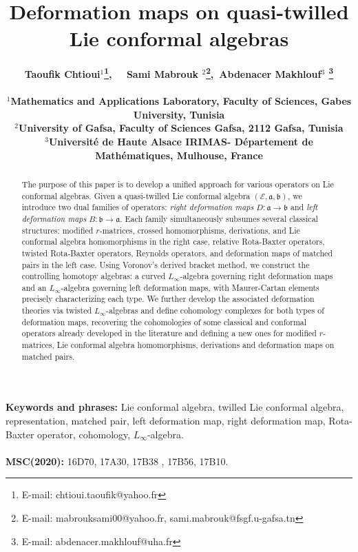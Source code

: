 \documentclass[a4paper,11pt]{article}
\def\Ep{\mathcal{E}}
\def\Vs{\mathfrak{a}}
\def\Ws{\mathfrak{b}}
\numberwithin{equation}{section}
\begin{document}

\title{\sf Deformation maps on quasi-twilled Lie conformal algebras}
\date{}
\author{ \bf 
  Taoufik Chtioui$^{1}$\footnote{E-mail: chtioui.taoufik@yahoo.fr  },
  \ \ Sami Mabrouk $^{2}$\footnote{E-mail: mabrouksami00@yahoo.fr, sami.mabrouk@fsgf.u-gafsa.tn  },\   Abdenacer Makhlouf$^{3}$
    \footnote {  E-mail:  abdenacer.makhlouf@uha.fr }
\\ \\
$^{1}${\small Mathematics and Applications Laboratory, Faculty of Sciences, Gabes University, Tunisia } \\
$^{2}${\small  University of Gafsa, Faculty of Sciences Gafsa, 2112 Gafsa, Tunisia }\\
$^{3}${\small Université de Haute Alsace IRIMAS- Département de Mathématiques, Mulhouse, 
France} 
}
\maketitle

\begin{abstract} The purpose of  this paper is to 
develop a unified approach  for various operators on 
Lie conformal algebras. Given a quasi-twilled Lie conformal algebra $(\Ep,\Vs,\Ws)$, we
introduce two dual families of operators: \emph{right deformation maps}
$D:\Vs\to\Ws$ and \emph{left deformation maps} $B:\Ws\to\Vs$. Each
family simultaneously subsumes several classical structures:
 modified $r$-matrices,  crossed homomorphisms,
 derivations, and  Lie conformal algebra homomorphisms in the
right case,  relative Rota-Baxter operators,  twisted
Rota-Baxter operators,  Reynolds operators, and deformation
maps of matched pairs in the left case. Using Voronov's derived bracket method, we construct the controlling homotopy algebras: a curved
$L_\infty$-algebra governing right deformation maps and an
$L_\infty$-algebra governing left deformation maps, with Maurer-Cartan
elements precisely characterizing each type. We further develop the
associated deformation theories via twisted $L_\infty$-algebras and
define cohomology complexes for both types of deformation maps, recovering  the cohomologies of some  classical and conformal operators already developed in the literature and defining  a new ones for modified $r$-matrices, Lie conformal algebra homomorphisms, derivations and deformation maps on matched pairs.
\end{abstract}
\textbf{Keywords and phrases:} Lie conformal algebra, twilled Lie conformal algebra, representation,  matched pair, left deformation map,  right deformation map, Rota-Baxter operator, cohomology, $L_\infty$-algebra.\\\\
{\textbf{MSC(2020):}} 16D70, 17A30, 	17B38 , 	17B56, 17B10.
\tableofcontents
\end{document}
